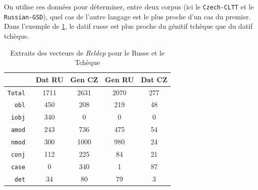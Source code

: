 \documentclass{cours}
\begin{document}
\renewcommand{\arraystretch}{1.1}
\begin{table}
        \centering
        \caption{Proximité pour la distance euclidienne avec l'\textit{Accusatif}}
	\label{tab_dist_acc}
\end{table}

On utilise ces données pour déterminer, entre deux corpus (ici le \texttt{Czech-CLTT} et le \texttt{Russian-GSD}), quel cas de l'autre langage est le plus proche d'un cas du premier.
Dans l'exemple de \ref{tab_reldep_ru_cz}, le datif russe est plus proche du génitif tchèque que du datif tchèque.

\begin{table}
	\centering
	\begin{tabular}{>{\tt}r|cccc}
		\toprule
		&Dat RU & Gen CZ & Gen RU & Dat CZ\\
		\midrule
		Total & 1711 & 2631 & 2070 & 277\\
		\midrule
		obl & 450 & 208 & 219 & 48\\
		iobj & 340 & 0 & 0 & 0\\
		amod & 243 & 736 & 475 & 54\\
		nmod & 300 & 1000 & 980 & 24\\
		conj & 112 & 225 & 84 & 21\\
		case & 0 & 340 & 1 & 87\\
		det & 34 & 80 & 79 & 3\\
		\bottomrule
	\end{tabular}
	\caption{Extraits des vecteurs de \textit{Reldep} pour le Russe et le Tchèque}
	\label{tab_reldep_ru_cz}
\end{table}
\end{document}
